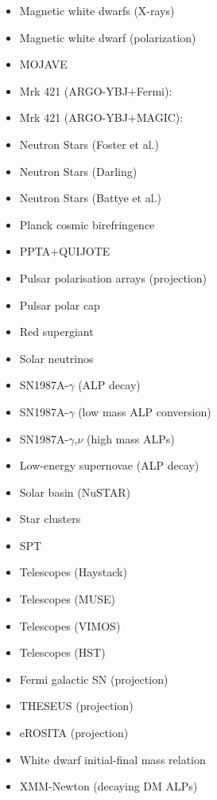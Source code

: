 \documentclass[9pt,twocolumn]{extarticle}
\begin{document}
\begin{mdframed}[everyline=true]
\begin{itemize}
    \item Magnetic white dwarfs (X-rays)~\cite{Dessert:2021bkv}
    \item Magnetic white dwarf (polarization)~\cite{Dessert:2022yqq}
    \item MOJAVE~\cite{Ivanov:2018byi}
    \item Mrk 421 (ARGO-YBJ+Fermi):~\cite{Li:2020pcn}
    \item Mrk 421 (ARGO-YBJ+MAGIC):~\cite{Li:2021gxs}
    \item Neutron Stars (Foster et al.)~\cite{Foster:2020pgt}
    \item Neutron Stars (Darling)~\cite{Darling:2020uyo}
    \item Neutron Stars (Battye et al.)~\cite{Battye:2021yue}
   	\item Planck cosmic birefringence~\cite{Fedderke:2019ajk}
    \item PPTA+QUIJOTE~\cite{Castillo:2022zfl}
    \item Pulsar polarisation arrays (projection)~\cite{Liu:2021zlt}
    \item Pulsar polar cap~\cite{Noordhuis:2022ljw}
    \item Red supergiant~\cite{Severino:2022nue}
    \item Solar neutrinos~\cite{Vinyoles2015}
    \item SN1987A-$\gamma$ (ALP decay)~\cite{Jaeckel:2017tud,Hoof:2022xbe}
    \item SN1987A-$\gamma$ (low mass ALP conversion)~\cite{Payez:2014xsa,Hoof:2022xbe}
    \item SN1987A-$\gamma$,$\nu$ (high mass ALPs)~\cite{Caputo:2021rux}
    \item Low-energy supernovae (ALP decay)~\cite{Caputo:2022mah}
    \item Solar basin (NuSTAR)~\cite{DeRocco:2022jyq}
    \item Star clusters~\cite{Dessert:2020lil}
    \item SPT~\cite{SPT-3G:2022ods}
    \item Telescopes (Haystack)~\cite{Blout:2000uc}
    \item Telescopes (MUSE)~\cite{Regis:2020fhw}
    \item Telescopes (VIMOS)~\cite{Grin:2006aw}
    \item Telescopes (HST)~\cite{Nakayama:2022jza,Carenza:2023qxh}
    \item Fermi galactic SN (projection)~\cite{Meyer:2016wrm}
     \item THESEUS (projection)~\cite{Thorpe-Morgan:2020rwc}
    \item eROSITA (projection)~\cite{Dekker:2021bos}
   \item White dwarf initial-final mass relation~\cite{Dolan:2021rya}
   \item XMM-Newton (decaying DM ALPs)~\cite{Foster:2021ngm}
\end{itemize}
\vspace{-2.5em}

\end{mdframed}
\end{document}
